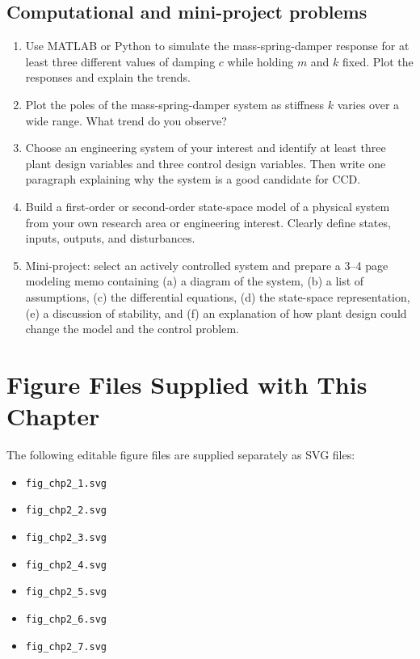 \documentclass[11pt]{article}
\begin{document}
\subsection*{Computational and mini-project problems}
\begin{enumerate}[leftmargin=1.5em,label=\textbf{P\arabic*.},resume]
  \item Use MATLAB or Python to simulate the mass-spring-damper response for at least three different values of damping $c$ while holding $m$ and $k$ fixed. Plot the responses and explain the trends.
  \item Plot the poles of the mass-spring-damper system as stiffness $k$ varies over a wide range. What trend do you observe?
  \item Choose an engineering system of your interest and identify at least three plant design variables and three control design variables. Then write one paragraph explaining why the system is a good candidate for CCD.
  \item Build a first-order or second-order state-space model of a physical system from your own research area or engineering interest. Clearly define states, inputs, outputs, and disturbances.
  \item Mini-project: select an actively controlled system and prepare a 3--4 page modeling memo containing (a) a diagram of the system, (b) a list of assumptions, (c) the differential equations, (d) the state-space representation, (e) a discussion of stability, and (f) an explanation of how plant design could change the model and the control problem.
\end{enumerate}

\section{Figure Files Supplied with This Chapter}

The following editable figure files are supplied separately as SVG files:
\begin{itemize}[leftmargin=1.4em]
  \item \texttt{fig\_chp2\_1.svg}
  \item \texttt{fig\_chp2\_2.svg}
  \item \texttt{fig\_chp2\_3.svg}
  \item \texttt{fig\_chp2\_4.svg}
  \item \texttt{fig\_chp2\_5.svg}
  \item \texttt{fig\_chp2\_6.svg}
  \item \texttt{fig\_chp2\_7.svg}
\end{itemize}
\end{document}
